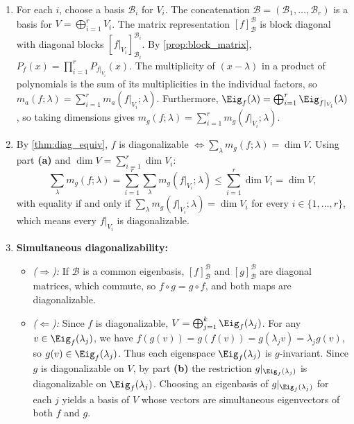 \begin{exercisesolution}
\label{sol:direct_sum_multiplicities_and_simultaneous_diagonalizability}
\begin{enumerate}[label=\textbf{(\alph*)}]
    \item For each $i$, choose a basis $\mathcal{B}_i$ for $V_i$. The concatenation $\mathcal{B} = (\mathcal{B}_1, \dots, \mathcal{B}_r)$ is a basis for $V = \bigoplus_{i=1}^r V_i$.
    The matrix representation $[f]_\mathcal{B}^\mathcal{B}$ is block diagonal with diagonal blocks $[f|_{V_i}]_{\mathcal{B}_i}^{\mathcal{B}_i}$.
    By \cref{prop:block_matrix}, $P_f(x) = \prod_{i=1}^r P_{f|_{V_i}}(x)$.
    The multiplicity of $(x - \lambda)$ in a product of polynomials is the sum of its multiplicities in the individual factors, so $m_a(f; \lambda) = \sum_{i=1}^r m_a(f|_{V_i}; \lambda)$.
    Furthermore, $\Eig_f(\lambda) = \bigoplus_{i=1}^r \Eig_{f|_{V_i}}(\lambda)$, so taking dimensions gives $m_g(f; \lambda) = \sum_{i=1}^r m_g(f|_{V_i}; \lambda)$.

    \item By \cref{thm:diag_equiv}, $f$ is diagonalizable $\iff \sum_\lambda m_g(f; \lambda) = \dim V$.
    Using part \textbf{(a)} and $\dim V = \sum_{i=1}^r \dim V_i$:
    \[
    \sum_{\lambda} m_g(f; \lambda) = \sum_{i=1}^r \sum_{\lambda} m_g(f|_{V_i}; \lambda) \le \sum_{i=1}^r \dim V_i = \dim V,
    \]
    with equality if and only if $\sum_\lambda m_g(f|_{V_i}; \lambda) = \dim V_i$ for every $i \in \{1, \dots, r\}$, which means every $f|_{V_i}$ is diagonalizable.

    \item \textbf{Simultaneous diagonalizability:}
    \begin{itemize}
        \item \emph{($\Rightarrow$):} If $\mathcal{B}$ is a common eigenbasis, $[f]_\mathcal{B}^\mathcal{B}$ and $[g]_\mathcal{B}^\mathcal{B}$ are diagonal matrices, which commute, so $f \circ g = g \circ f$, and both maps are diagonalizable.
        \item \emph{($\Leftarrow$):} Since $f$ is diagonalizable, $V = \bigoplus_{j=1}^k \Eig_f(\lambda_j)$.
        For any $v \in \Eig_f(\lambda_j)$, we have $f(g(v)) = g(f(v)) = g(\lambda_j v) = \lambda_j g(v)$, so $g(v) \in \Eig_f(\lambda_j)$.
        Thus each eigenspace $\Eig_f(\lambda_j)$ is $g$-invariant.
        Since $g$ is diagonalizable on $V$, by part \textbf{(b)} the restriction $g|_{\Eig_f(\lambda_j)}$ is diagonalizable on $\Eig_f(\lambda_j)$.
        Choosing an eigenbasis of $g|_{\Eig_f(\lambda_j)}$ for each $j$ yields a basis of $V$ whose vectors are simultaneous eigenvectors of both $f$ and $g$. \qedhere
    \end{itemize}
\end{enumerate}
\end{exercisesolution}

